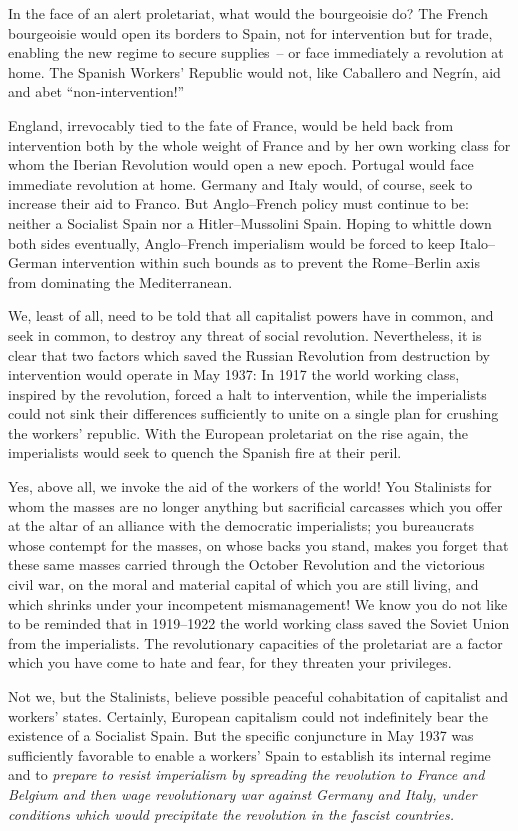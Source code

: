 In the face of an alert proletariat, what would the bourgeoisie do? The French bourgeoisie would open its borders to Spain, not for intervention but for trade, enabling the new regime to secure supplies~-- or face immediately a revolution at home. The Spanish Workers’ Republic would not, like Caballero and Negr\'in, aid and abet ``non-intervention!''

England, irrevocably tied to the fate of France, would be held back from intervention both by the whole weight of France and by her own working class for whom the Iberian Revolution would open a new epoch. Portugal would face immediate revolution at home. Germany and Italy would, of course, seek to increase their aid to Franco. But Anglo--French policy must continue to be: neither a Socialist Spain nor a Hitler--Mussolini Spain. Hoping to whittle down both sides eventually, Anglo--French imperialism would be forced to keep Italo--German intervention within such bounds as to prevent the Rome--Berlin axis from dominating the Mediterranean.

We, least of all, need to be told that all capitalist powers have in common, and seek in common, to destroy any threat of social revolution. Nevertheless, it is clear that two factors which saved the Russian Revolution from destruction by intervention would operate in May 1937: In 1917 the world working class, inspired by the revolution, forced a halt to intervention, while the imperialists could not sink their differences sufficiently to unite on a single plan for crushing the workers’ republic. With the European proletariat on the rise again, the imperialists would seek to quench the Spanish fire at their peril.

Yes, above all, we invoke the aid of the workers of the world! You Stalinists for whom the masses are no longer anything but sacrificial carcasses which you offer at the altar of an alliance with the democratic imperialists; you bureaucrats whose contempt for the masses, on whose backs you stand, makes you forget that these same masses carried through the October Revolution and the victorious civil war, on the moral and material capital of which you are still living, and which shrinks under your incompetent mismanagement! We know you do not like to be reminded that in 1919–1922 the world working class saved the Soviet Union from the imperialists. The revolutionary capacities of the proletariat are a factor which you have come to hate and fear, for they threaten your privileges.

Not we, but the Stalinists, believe possible peaceful cohabitation of capitalist and workers’ states. Certainly, European capitalism could not indefinitely bear the existence of a Socialist Spain. But the specific conjuncture in May 1937 was sufficiently favorable to enable a workers’ Spain to establish its internal regime and to \emph{prepare to resist imperialism by spreading the revolution to France and Belgium and then wage revolutionary war against Germany and Italy, under conditions which would precipitate the revolution in the fascist countries.}

